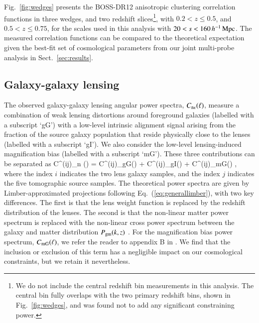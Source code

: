 Fig.~\ref{fig:wedges} presents the \citet{sanchez/etal:2017} BOSS-DR12 anisotropic clustering correlation functions in three wedges, and two redshift slices\footnote{We do not include the \citet{sanchez/etal:2017} central redshift bin measurements in this analysis.  The central bin fully overlaps with the two primary redshift bins, shown in Fig.~\ref{fig:wedges}, and was found not to add any significant constraining power.}, with $0.2<z\leq0.5$, and $0.5<z\leq0.75$, for the scales used in this analysis with $20  < s < 160\, h^{-1}\, {\rm Mpc}$.   The measured correlation functions can be compared to the theoretical expectation given the best-fit set of cosmological parameters from our joint multi-probe analysis in Sect.~\ref{sec:results}.

\subsection{Galaxy-galaxy lensing}
\label{sec:GGL}
The observed galaxy-galaxy lensing angular power spectra, $C_{\rm n \epsilon}(\ell)$, measure a combination of weak lensing distortions around foreground galaxies (labelled with a subscript `gG') with a low-level intrinsic alignment signal arising from the fraction of the source galaxy population that reside physically close to the lenses (labelled with a subscript `gI').   We also consider the low-level lensing-induced magnification bias (labelled with a subscript `mG').   These three contributions can be separated as 
\be
\label{eq:cl_ggl}
C^{(ij)}_{\rm n \epsilon}(\ell) = C^{(ij)}_{\rm gG}(\ell) +
C^{(ij)}_{\rm gI}(\ell) + C^{(ij)}_{\rm mG}(\ell)  \;,
\ee
where the index $i$ indicates the two lens galaxy samples, and the index $j$ indicates the five tomographic source samples.   The theoretical power spectra are given by Limber-approximated projections following Eq.~(\ref{eq:generallimber}), with two key differences.   The first is that the lens weight function is replaced by the redshift distribution of the lenses.   The second is that the non-linear matter power spectrum is replaced with the non-linear cross power spectrum between the galaxy and matter distribution $P_{\rm gm}(k,z)$ \citep[see equations 24 and 25 of][for the full expressions]{joachimi/etal:inprep}.   For the magnification bias power spectrum, $C_{\rm mG}(\ell)$, we refer the reader to appendix B in \citet{joachimi/etal:inprep}.   We find that the inclusion or exclusion of this term has a negligible impact on our cosmological constraints, but we retain it nevertheless.

